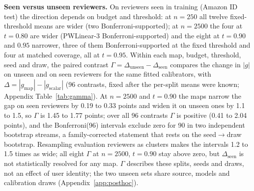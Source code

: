 \documentclass[sigconf,anonymous,review]{acmart}
\begin{document}
\textbf{Seen versus unseen reviewers.} On reviewers seen in training (Amazon ID test) the
direction depends on budget and threshold: at $n{=}250$ all twelve
fixed-threshold means are wider (two Bonferroni-supported); at $n{=}2500$
the four at $t{=}0.80$ are wider (PWLinear-3 Bonferroni-supported) and the
eight at $t{=}0.90$ and $0.95$ narrower, three of them Bonferroni-supported
at the fixed threshold and four at matched coverage, all at $t{=}0.95$.
Within each map, budget, threshold, seed and draw, the paired contrast
$\Gamma=\Delta_{\text{unseen}}-\Delta_{\text{seen}}$
compares the change in $|g|$ on unseen and on seen reviewers for the same
fitted calibrators, with $\Delta=|g_{\text{map}}|-|g_{\text{scalar}}|$ (96
contrasts, fixed after the per-split means were known; Appendix
Table~\ref{tab:gamma}). At $n{=}2500$ and $t{=}0.90$ the maps narrow the gap
on seen reviewers by 0.19 to 0.33 points and widen it on unseen ones by 1.1
to 1.5, so $\Gamma$ is 1.45 to 1.77 points; over all 96 contrasts $\Gamma$
is positive (0.41 to 2.04 points), and the Bonferroni(96) intervals
exclude zero for 90 in two independent bootstrap streams, a
family-corrected statement that rests on the seed$\to$draw bootstrap. Resampling
evaluation reviewers as clusters makes the intervals 1.2 to 1.5 times as
wide; all eight $\Gamma$ at $n{=}2500$, $t{=}0.90$ stay above zero, but
$\Delta_{\text{seen}}$ is not statistically resolved for any map.
$\Gamma$ describes these splits, seeds and draws, not an effect of user
identity; the two unseen sets share source, models and calibration draws
(Appendix~\ref{app:posthoc}).
\end{document}

